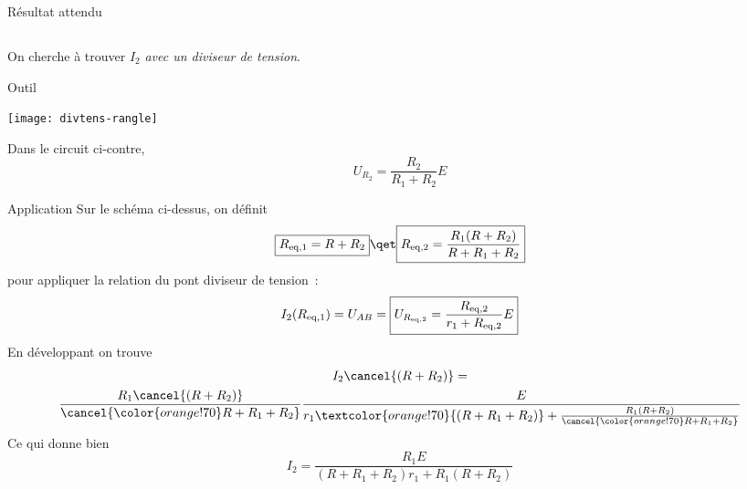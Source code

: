 \documentclass[a4paper, 12pt, final, garamond]{book}
\begin{document}
\begin{tcbraster}[raster columns=2, raster equal height=rows]
    \begin{NCprop}[]{Résultat attendu}
        \subsection{}
        On cherche à trouver $I_2$ \textit{avec un diviseur de tension}.
    \end{NCprop}
    \begin{NCrapp}[sidebyside, righthand ratio=.4]{Outil}
        \begin{center}
            \texttt{[image: divtens-rangle]}
        \end{center}
        \tcblower
        \begin{center}
            Dans le circuit ci-contre,
            \[ U_{R_2} = \frac{R_2}{R_1+R_2}E\]
        \end{center}
    \end{NCrapp}
\end{tcbraster}
\begin{NCexem}{Application}
    Sur le schéma ci-dessus, on définit
    \[ \boxed{R_{\rm eq,1} = R+R_2} \qet \boxed{R_{\rm eq,2} =
        \frac{R_1(R+R_2)}{R + R_1 + R_2}}\]
    pour appliquer la relation du pont diviseur de tension~:
    \begin{equation*}
        I_2(R_{\rm eq,1}) = U_{AB} =
            \boxed{U_{R_{\rm eq,2}} = \frac{R_{\rm eq,2}}{r_1 + R_{\rm eq,2}}E}
    \end{equation*}
    \tcblower
    En développant on trouve
    \begin{gather*}
        I_2\cancel{(R+R_2)} =\\
            \frac{R_1\cancel{(R+R_2)}}{\cancel{\color{orange!70}R + R_1 + R_2}}
            \frac{E}{r_1 \textcolor{orange!70}{(R+R_1+R_2)}
                    + \frac{R_1(R+R_2)}{\cancel{\color{orange!70}R + R_1 +
                R_2}}}
    \end{gather*}
    Ce qui donne bien
    \begin{equation*}
        \boxed{I_2 = \frac{R_1E}{(R+R_1+R_2)r_1 + R_1(R+R_2)}}
    \end{equation*}
\end{NCexem}
\end{document}

